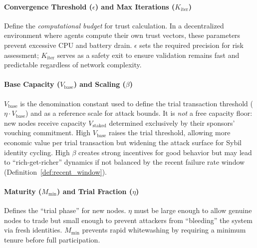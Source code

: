 \documentclass[11pt]{article}
\begin{document}
\paragraph{Convergence Threshold ($\epsilon$) and Max Iterations ($K_{\text{iter}}$)}
Define the \emph{computational budget} for trust calculation. In a decentralized environment where agents compute their own trust vectors, these parameters prevent excessive CPU and battery drain. $\epsilon$ sets the required precision for risk assessment; $K_{\text{iter}}$ serves as a safety exit to ensure validation remains fast and predictable regardless of network complexity.

\paragraph{Base Capacity ($V_{\text{base}}$) and Scaling ($\beta$)}
$V_{\text{base}}$ is the denomination constant used to define the trial transaction threshold ($\eta \cdot V_{\text{base}}$) and as a reference scale for attack bounds. It is \emph{not} a free capacity floor: new nodes receive capacity $V_{\text{staked}}$ determined exclusively by their sponsors' vouching commitment. High $V_{\text{base}}$ raises the trial threshold, allowing more economic value per trial transaction but widening the attack surface for Sybil identity cycling. High $\beta$ creates strong incentives for good behavior but may lead to ``rich-get-richer'' dynamics if not balanced by the recent failure rate window (Definition~\ref{def:recent_window}).

\paragraph{Maturity ($M_{\min}$) and Trial Fraction ($\eta$)}
Defines the ``trial phase'' for new nodes. $\eta$ must be large enough to allow genuine nodes to trade but small enough to prevent attackers from ``bleeding'' the system via fresh identities. $M_{\min}$ prevents rapid whitewashing by requiring a minimum tenure before full participation.
\end{document}
